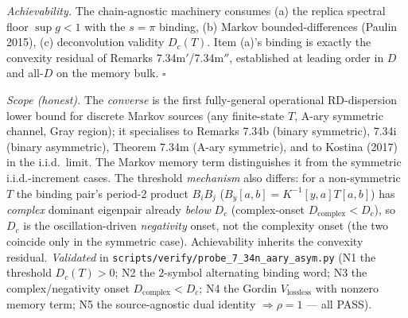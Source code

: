 \documentclass[
]{article}
\begin{document}
\emph{Achievability.} The chain-agnostic machinery consumes (a) the replica
spectral floor $\sup g<1$ with the $s=\pi$ binding, (b) Markov bounded-differences
(Paulin 2015), (c) deconvolution validity $D_c(T)$. Item (a)'s binding is exactly
the convexity residual of Remarks 7.34m$'$/7.34m$''$, established at leading order
in $D$ and all-$D$ on the memory bulk. \hfill$\square$

\emph{Scope (honest).} The \emph{converse} is the first fully-general operational
RD-dispersion lower bound for discrete Markov sources (any finite-state $T$,
A-ary symmetric channel, Gray region); it specialises to Remarks 7.34b (binary
symmetric), 7.34i (binary asymmetric), Theorem 7.34m (A-ary symmetric), and to
Kostina (2017) in the i.i.d.\ limit. The Markov memory term distinguishes it from
the symmetric i.i.d.-increment cases. The threshold \emph{mechanism} also
differs: for a non-symmetric $T$ the binding pair's period-2 product $B_iB_j$
($B_y[a,b]=K^{-1}[y,a]T[a,b]$) has \emph{complex} dominant eigenpair already
\emph{below} $D_c$ (complex-onset $D_{\mathrm{complex}}<D_c$), so $D_c$ is the
oscillation-driven \emph{negativity} onset, not the complexity onset (the two
coincide only in the symmetric case). Achievability inherits the convexity
residual. \emph{Validated} in \texttt{scripts/verify/probe\_7\_34n\_aary\_asym.py}
(N1 the threshold $D_c(T)>0$; N2 the $2$-symbol alternating binding word; N3 the
complex/negativity onset $D_{\mathrm{complex}}<D_c$; N4 the Gordin
$V_{\mathrm{lossless}}$ with nonzero memory term; N5 the source-agnostic dual
identity $\Rightarrow\rho=1$ --- all PASS).
\end{document}
